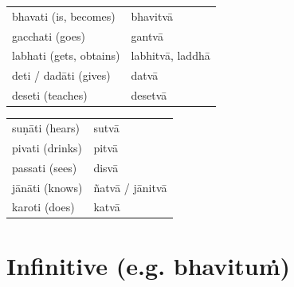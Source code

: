 \documentclass[a4paper]{memoir}
\begin{document}
\begin{multicols}{2}

\begin{center}
\begin{tabular}{ll}
bhavati (is, becomes) & bhavitvā\\[0pt]
gacchati (goes) & gantvā\\[0pt]
labhati (gets, obtains) & labhitvā, laddhā\\[0pt]
deti / dadāti (gives) & datvā\\[0pt]
deseti (teaches) & desetvā\\[0pt]
\end{tabular}
\end{center}

\columnbreak

\begin{center}
\begin{tabular}{ll}
suṇāti (hears) & sutvā\\[0pt]
pivati (drinks) & pitvā\\[0pt]
passati (sees) & disvā\\[0pt]
jānāti (knows) & ñatvā / jānitvā\\[0pt]
karoti (does) & katvā\\[0pt]
\end{tabular}
\end{center}

\end{multicols}

\section{Infinitive (e.g. bhavituṁ)}
\label{sec:org3054727}
\end{document}
